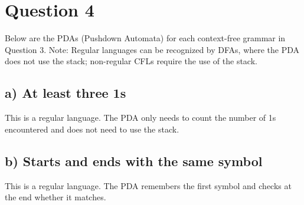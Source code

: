 \documentclass[a4paper, UTF-8]{article}
\theoremstyle{plain}
\begin{document}
\section{Question 4}

Below are the PDAs (Pushdown Automata) for each context-free grammar in Question 3. Note: Regular languages can be recognized by DFAs, where the PDA does not use the stack; non-regular CFLs require the use of the stack.

\subsection{a) At least three 1s}

This is a regular language. The PDA only needs to count the number of 1s encountered and does not need to use the stack.


\subsection{b) Starts and ends with the same symbol}

This is a regular language. The PDA remembers the first symbol and checks at the end whether it matches.
\end{document}
